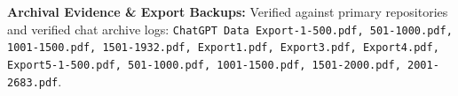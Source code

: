 \documentclass[10pt,a4paper]{article}
\begin{document}
\begin{tcolorbox}[enhanced, colback=lightbg, colframe=cardborder, boxrule=0.4pt, arc=3pt, left=8pt, right=8pt, top=4pt, bottom=4pt]
  {\scriptsize\textbf{\color{primary}Archival Evidence \& Export Backups:}
  Verified against primary repositories and verified chat archive logs:
  \texttt{ChatGPT Data Export-1-500.pdf, 501-1000.pdf, 1001-1500.pdf, 1501-1932.pdf, Export1.pdf, Export3.pdf, Export4.pdf, Export5-1-500.pdf, 501-1000.pdf, 1001-1500.pdf, 1501-2000.pdf, 2001-2683.pdf}.}
\end{tcolorbox}
\end{document}
